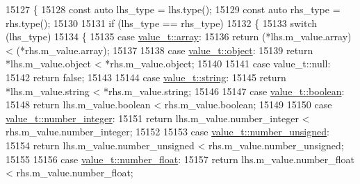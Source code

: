 \begin{DoxyCode}
15127     \{
15128         \textcolor{keyword}{const} \textcolor{keyword}{auto} lhs\_type = lhs.type();
15129         \textcolor{keyword}{const} \textcolor{keyword}{auto} rhs\_type = rhs.type();
15130 
15131         \textcolor{keywordflow}{if} (lhs\_type == rhs\_type)
15132         \{
15133             \textcolor{keywordflow}{switch} (lhs\_type)
15134             \{
15135                 \textcolor{keywordflow}{case} \hyperlink{namespacenlohmann_1_1detail_a1ed8fc6239da25abcaf681d30ace4985af1f713c9e000f5d3f280adbd124df4f5}{value\_t::array}:
15136                     \textcolor{keywordflow}{return} (*lhs.m\_value.array) < (*rhs.m\_value.array);
15137 
15138                 \textcolor{keywordflow}{case} \hyperlink{namespacenlohmann_1_1detail_a1ed8fc6239da25abcaf681d30ace4985aa8cfde6331bd59eb2ac96f8911c4b666}{value\_t::object}:
15139                     \textcolor{keywordflow}{return} *lhs.m\_value.object < *rhs.m\_value.object;
15140 
15141                 \textcolor{keywordflow}{case} value\_t::null:
15142                     \textcolor{keywordflow}{return} \textcolor{keyword}{false};
15143 
15144                 \textcolor{keywordflow}{case} \hyperlink{namespacenlohmann_1_1detail_a1ed8fc6239da25abcaf681d30ace4985ab45cffe084dd3d20d928bee85e7b0f21}{value\_t::string}:
15145                     \textcolor{keywordflow}{return} *lhs.m\_value.string < *rhs.m\_value.string;
15146 
15147                 \textcolor{keywordflow}{case} \hyperlink{namespacenlohmann_1_1detail_a1ed8fc6239da25abcaf681d30ace4985a84e2c64f38f78ba3ea5c905ab5a2da27}{value\_t::boolean}:
15148                     \textcolor{keywordflow}{return} lhs.m\_value.boolean < rhs.m\_value.boolean;
15149 
15150                 \textcolor{keywordflow}{case} \hyperlink{namespacenlohmann_1_1detail_a1ed8fc6239da25abcaf681d30ace4985a5763da164f8659d94a56e29df64b4bcc}{value\_t::number\_integer}:
15151                     \textcolor{keywordflow}{return} lhs.m\_value.number\_integer < rhs.m\_value.number\_integer;
15152 
15153                 \textcolor{keywordflow}{case} \hyperlink{namespacenlohmann_1_1detail_a1ed8fc6239da25abcaf681d30ace4985adce7cc8ec29055c4158828921f2f265e}{value\_t::number\_unsigned}:
15154                     \textcolor{keywordflow}{return} lhs.m\_value.number\_unsigned < rhs.m\_value.number\_unsigned;
15155 
15156                 \textcolor{keywordflow}{case} \hyperlink{namespacenlohmann_1_1detail_a1ed8fc6239da25abcaf681d30ace4985ad9966ecb59667235a57b4b999a649eef}{value\_t::number\_float}:
15157                     \textcolor{keywordflow}{return} lhs.m\_value.number\_float < rhs.m\_value.number\_float;

\end{DoxyCode}
